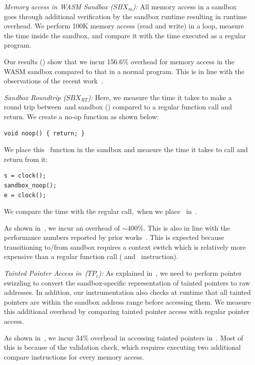 \noindent\emph{Memory access in WASM Sandbox ($SBX_{m}$):} 
All memory access in a sandbox goes through additional verification by the sandbox runtime resulting in runtime overhead.
We perform 100K memory access (read and write) in a loop, measure the time inside the sandbox, and compare it with the time executed as a regular program.

Our results () show that we incur 156.6\% overhead for memory access in the WASM sandbox compared to that in a normal program.
This is in line with the observations of the recent work~\cite{jangda2019not}.

\noindent\emph{Sandbox Roundtrip ($SBX_{RT}$):}
Here, we measure the time it takes to make a round trip between~\cregion and sandbox (\ucregion) compared to a regular function call and return.
We create a no-op function as shown below:
\begin{verbatim}
void noop() { return; }
\end{verbatim}
We place this~ function in the sandbox and measure the time it takes to call and return from it:
\begin{verbatim}
s = clock();
sandbox_noop();
e = clock();
\end{verbatim}
We compare the time with the regular call,~\ie when we place~ in~\cregion.

As shown in~, we incur an overhead of $\sim 400\%$. This is also in line with the performance numbers reported by prior works~\cite{jangda2019not, rlbox-paper}.
This is expected because transitioning to/from sandbox requires a context switch which is relatively more expensive than a regular function call (\ie{} and~ instruction).

\noindent\emph{Tainted Pointer Access in~\cregion ($TP_{c}$):}
As explained in~, we need to perform pointer swizzling to convert the sandbox-specific representation of tainted pointers to raw addresses.
In addition, our instrumentation also checks at runtime that all tainted pointers are within the sandbox address range before accessing them.
We measure this additional overhead by comparing tainted pointer access with regular pointer access.

As shown in~, we incur 34\% overhead in accessing tainted pointers in~\cregion.
Most of this is because of the validation check, which requires executing two additional compare instructions for every memory access.

